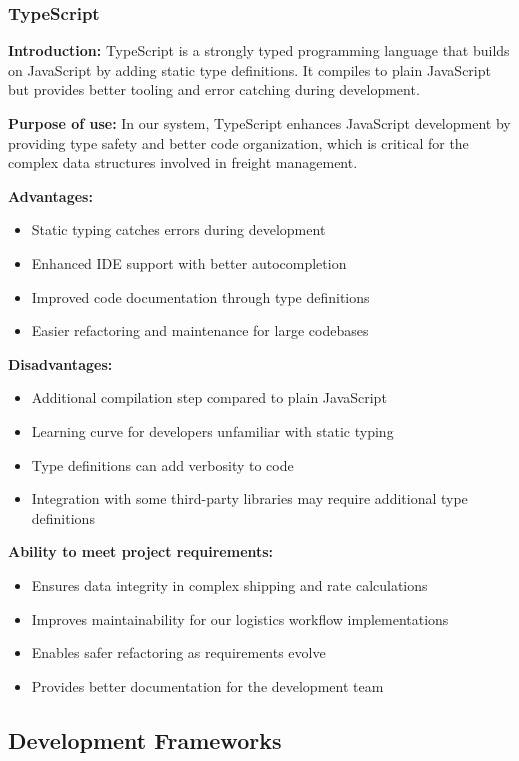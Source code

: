 \subsubsection{TypeScript}
\textbf{Introduction:} TypeScript \cite{ts} is a strongly typed programming language that builds on JavaScript by adding static type definitions. It compiles to plain JavaScript but provides better tooling and error catching during development.

\textbf{Purpose of use:} In our system, TypeScript enhances JavaScript development by providing type safety and better code organization, which is critical for the complex data structures involved in freight management.

\textbf{Advantages:}
\begin{itemize}
    \item Static typing catches errors during development
    \item Enhanced IDE support with better autocompletion
    \item Improved code documentation through type definitions
    \item Easier refactoring and maintenance for large codebases
\end{itemize}

\textbf{Disadvantages:}
\begin{itemize}
    \item Additional compilation step compared to plain JavaScript
    \item Learning curve for developers unfamiliar with static typing
    \item Type definitions can add verbosity to code
    \item Integration with some third-party libraries may require additional type definitions
\end{itemize}

\textbf{Ability to meet project requirements:}
\begin{itemize}
    \item Ensures data integrity in complex shipping and rate calculations
    \item Improves maintainability for our logistics workflow implementations
    \item Enables safer refactoring as requirements evolve
    \item Provides better documentation for the development team
\end{itemize}

\subsection{Development Frameworks}
